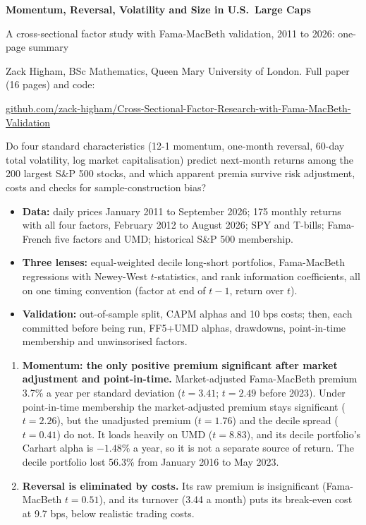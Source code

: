 \documentclass[10pt,a4paper]{article}
\newcommand{\head}[1]{\vspace{3pt}{\large\bfseries #1}\par\vspace{1pt}}
\begin{document}
{\LARGE\bfseries Momentum, Reversal, Volatility and Size in U.S.\ Large Caps}\par
\vspace{2pt}
{\large A cross-sectional factor study with Fama-MacBeth validation, 2011 to 2026: one-page summary}\par
\vspace{2pt}
Zack Higham, BSc Mathematics, Queen Mary University of London. Full paper (16 pages) and code:\par{\small\href{https://github.com/zack-higham/Cross-Sectional-Factor-Research-with-Fama-MacBeth-Validation}{github.com/zack-higham/Cross-Sectional-Factor-Research-with-Fama-MacBeth-Validation}}

\head{Question}
Do four standard characteristics (12-1 momentum, one-month reversal, 60-day total volatility, log market capitalisation) predict next-month returns among the 200 largest S\&P 500 stocks, and which apparent premia survive risk adjustment, costs and checks for sample-construction bias?

\head{Data and method}
\begin{itemize}
\item \textbf{Data:} daily prices January 2011 to September 2026; 175 monthly returns with all four factors, February 2012 to August 2026; SPY and T-bills; Fama-French five factors and UMD; historical S\&P 500 membership.
\item \textbf{Three lenses:} equal-weighted decile long-short portfolios, Fama-MacBeth regressions with Newey-West $t$-statistics, and rank information coefficients, all on one timing convention (factor at end of $t-1$, return over $t$).
\item \textbf{Validation:} out-of-sample split, CAPM alphas and 10 bps costs; then, each committed before being run, FF5+UMD alphas, drawdowns, point-in-time membership and unwinsorised factors.
\end{itemize}

\head{Findings}
\begin{enumerate}
\item \textbf{Momentum: the only positive premium significant after market adjustment and point-in-time.} Market-adjusted Fama-MacBeth premium 3.7\% a year per standard deviation ($t = 3.41$; $t = 2.49$ before 2023). Under point-in-time membership the market-adjusted premium stays significant ($t = 2.26$), but the unadjusted premium ($t = 1.76$) and the decile spread ($t = 0.41$) do not. It loads heavily on UMD ($t = 8.83$), and its decile portfolio's Carhart alpha is $-1.48\%$ a year, so it is not a separate source of return. The decile portfolio lost 56.3\% from January 2016 to May 2023.
\item \textbf{Reversal is eliminated by costs.} Its raw premium is insignificant (Fama-MacBeth $t = 0.51$), and its turnover (3.44 a month) puts its break-even cost at 9.7 bps, below realistic trading costs.
\end{enumerate}
\end{document}
